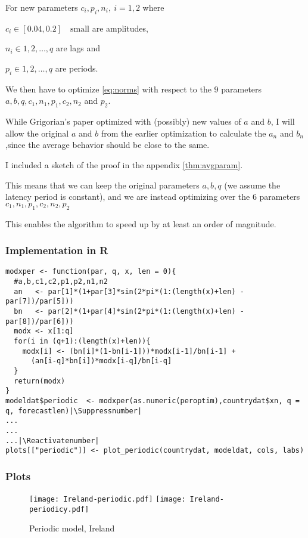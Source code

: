 For new parameters $c_i,p_i,n_i, \ i=1,2$ where

$c_i  \in [0.04, 0.2] \quad \text{small}$ are amplitudes,

$n_i  \in 1,2,\dots,q$ are lags and

$p_i  \in 1,2,\dots,q$ are periods.

We then have to optimize \ref{eq:norms} with respect to the $9$ parameters $a,b,q,c_1,n_1,p_1,c_2,n_2$ and $p_2$.

While Grigorian's paper \cite{grigor20} optimized with (possibly) new values of $a$ and $b$, I will allow the original $a$ and $b$ from the earlier optimization to calculate the $a_n$ and $b_n$,since the average behavior should be close to the same. 

I included a sketch of the proof in the appendix \ref{thm:avgparam}.

This means that we can keep the original parameters $a,b,q$ (we assume the latency period is constant), and we are instead optimizing over the $6$ parameters $c_1,n_1,p_1,c_2,n_2,p_2$

This enables the algorithm to speed up by at least an order of magnitude.

\subsubsection{Implementation in R}

\begin{lstlisting}[breaklines = true, escapeinside=||, tabsize = 4, frame=single, caption = {Algorithm for Periodic Model}]
modxper <- function(par, q, x, len = 0){
  #a,b,c1,c2,p1,p2,n1,n2
  an   <- par[1]*(1+par[3]*sin(2*pi*(1:(length(x)+len) - par[7])/par[5]))
  bn   <- par[2]*(1+par[4]*sin(2*pi*(1:(length(x)+len) - par[8])/par[6]))
  modx <- x[1:q]
  for(i in (q+1):(length(x)+len)){
    modx[i] <- (bn[i]*(1-bn[i-1]))*modx[i-1]/bn[i-1] +
      (an[i-q]*bn[i])*modx[i-q]/bn[i-q]
  }
  return(modx)
}
modeldat$periodic  <- modxper(as.numeric(peroptim),countrydat$xn, q = q, forecastlen)|\Suppressnumber|
...
...
...|\Reactivatenumber|
plots[["periodic"]] <- plot_periodic(countrydat, modeldat, cols, labs)
\end{lstlisting}

\subsubsection{Plots}

\begin{figure}[H]
  \texttt{[image: Ireland-periodic.pdf]} \label{fig:ireland-periodic}
\endminipage\hfill
{}
  \texttt{[image: Ireland-periodicy.pdf]} \label{fig:ireland-periodicy}
\endminipage
\caption{Periodic model, Ireland}
\end{figure}

